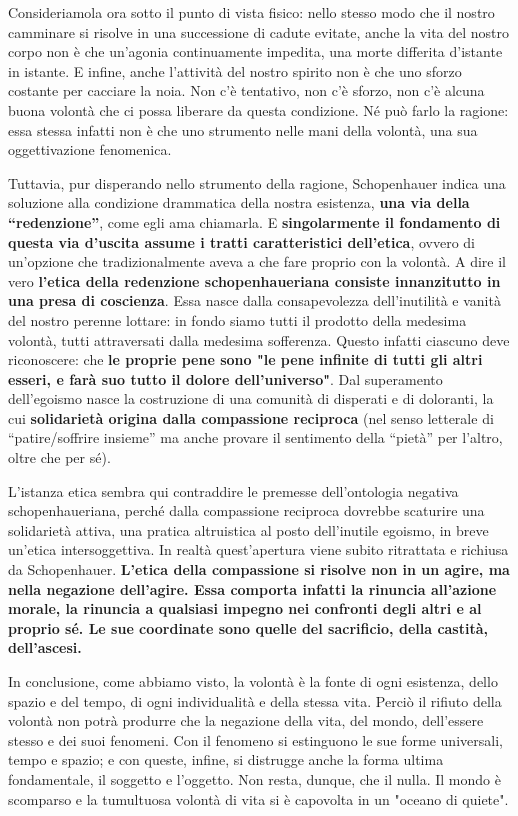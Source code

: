 Consideriamola ora sotto il punto di vista fisico: nello stesso modo che il nostro camminare si risolve in una successione di cadute evitate, anche la vita del nostro corpo non è che un’agonia continuamente impedita, una morte differita d’istante in istante. E infine, anche l’attività del nostro spirito non è che uno sforzo costante per cacciare la noia.  Non c’è tentativo, non c’è sforzo, non c’è alcuna buona volontà che ci possa liberare da questa condizione. Né può farlo la ragione: essa stessa infatti non è che uno strumento nelle mani della volontà, una sua oggettivazione fenomenica.

Tuttavia, pur disperando nello strumento della ragione, Schopenhauer indica una soluzione alla condizione drammatica della nostra esistenza, \textbf{una via della “redenzione”}, come egli ama chiamarla. E \textbf{singolarmente il fondamento di questa via d’uscita assume i tratti caratteristici dell’etica}, ovvero di un’opzione che tradizionalmente aveva a che fare proprio con la volontà. A dire il vero \textbf{l’etica della redenzione schopenhaueriana consiste innanzitutto in una presa di coscienza}. Essa nasce dalla consapevolezza dell’inutilità e vanità del nostro perenne lottare: in fondo siamo tutti il prodotto della medesima volontà, tutti attraversati dalla medesima sofferenza. Questo infatti ciascuno deve riconoscere: che \textbf{le proprie pene sono "le pene infinite di tutti gli altri esseri, e farà suo tutto il dolore dell’universo"}. Dal superamento dell’egoismo nasce la costruzione di una comunità di disperati e di doloranti, la cui \textbf{solidarietà origina dalla compassione reciproca} (nel senso letterale di “patire/soffrire insieme” ma anche provare il sentimento della “pietà” per l’altro, oltre che per sé). 

L’istanza etica sembra qui contraddire le premesse dell’ontologia negativa schopenhaueriana, perché dalla compassione reciproca dovrebbe scaturire una solidarietà attiva, una pratica altruistica al posto dell’inutile egoismo, in breve un’etica intersoggettiva. In realtà quest’apertura viene subito ritrattata e richiusa da Schopenhauer. \textbf{L’etica della compassione si risolve non in un agire, ma nella negazione dell’agire. Essa comporta infatti la rinuncia all’azione morale, la rinuncia a qualsiasi impegno nei confronti degli altri e al proprio sé. Le sue coordinate sono quelle del sacrificio, della castità, dell’ascesi.} 

In conclusione, come abbiamo visto, la volontà è la fonte di ogni esistenza, dello spazio e del tempo, di ogni individualità e della stessa vita. Perciò il rifiuto della volontà non potrà produrre che la negazione della vita, del mondo, dell’essere stesso e dei suoi fenomeni. Con il fenomeno si estinguono le sue forme universali, tempo e spazio; e con queste, infine, si distrugge anche la forma ultima fondamentale, il soggetto e l’oggetto. Non resta, dunque, che il nulla. Il mondo è scomparso e la tumultuosa volontà di vita si è capovolta in un "oceano di quiete".

